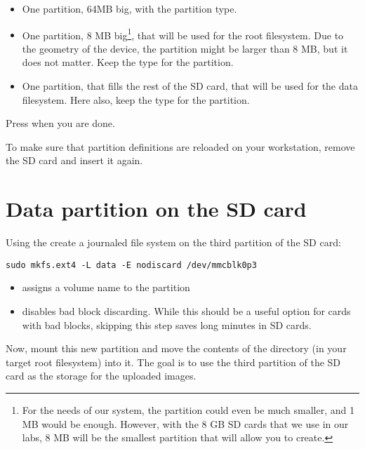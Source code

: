\begin{itemize}

\item One partition, 64MB big, with the  partition type.

\item One partition, 8 MB big\footnote{For the needs of our system,
  the partition could even be much smaller, and 1 MB would be enough.
  However, with the 8 GB SD cards that we use in our labs, 8 MB will
  be the smallest partition that  will allow you to
  create.}, that will be used for the root filesystem. Due to the
  geometry of the device, the partition might be larger than 8 MB,
  but it does not matter. Keep the  type for the
  partition.

\item One partition, that fills the rest of the SD card, that will be
  used for the data filesystem. Here also, keep the  type
  for the partition.

\end{itemize}

Press  when you are done.

To make sure that partition definitions are reloaded on your
workstation, remove the SD card and insert it again.

\section{Data partition on the SD card}

Using the  create a journaled file system on the
third partition of the SD card:

\begin{verbatim}
sudo mkfs.ext4 -L data -E nodiscard /dev/mmcblk0p3
\end{verbatim}

\begin{itemize}
\item {} assigns a volume name to the partition
\item {} disables bad block discarding. While this
      should be a useful option for cards with bad blocks, skipping
      this step saves long minutes in SD cards.
\end{itemize}

Now, mount this new partition and move the contents of the
 directory (in your target root filesystem) into
it. The goal is to use the third partition of the SD card as the storage
for the uploaded images.

